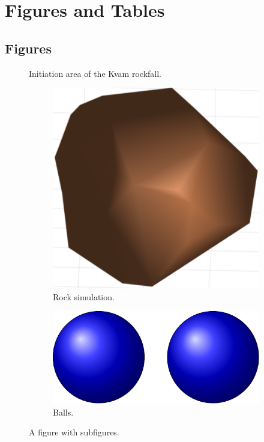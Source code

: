 \chapter{Figures and Tables}
\label{sec:first-app}

\section{Figures}

\begin{figure}[hbp]
    \centering
    \caption[Rockfall]{Initiation area of the Kvam rockfall.}
\end{figure}

\begin{figure}[htbp]
    \centering
    \begin{subfigure}[t]{0.5\linewidth}
        \centering
        \includegraphics[height = 0.12\textheight]{figures/rock}
        \caption{Rock simulation.}
        \label{fig:rock}
    \end{subfigure}%
    \begin{subfigure}[t]{0.5\linewidth}
        \centering
        \includegraphics[height = 0.12\textheight]{figures/balls}
        \caption{Balls.}
    \end{subfigure}
    \caption[Subfigures]{A figure with subfigures.}
    \label{fig:rock-and-balls}
\end{figure}

